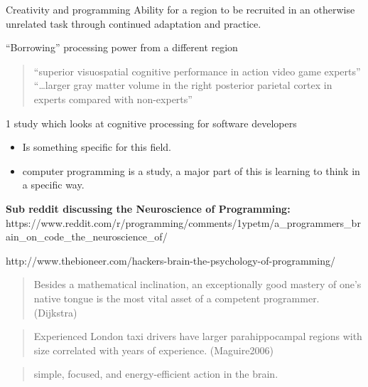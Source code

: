 \begin{frame}{Creativity and programming}
Ability for a region to be recruited in an otherwise unrelated task
through continued adaptation and practice.

``Borrowing'' processing power from a different region

\begin{quote}
``superior visuospatial cognitive performance in action video game
experts'' ``\ldots{}larger gray matter volume in the right posterior
parietal cortex in experts compared with non-experts''
\end{quote}

1 study which looks at cognitive processing for software developers

\begin{itemize}
\tightlist
\item
  Is something specific for this field.
\item
  computer programming is a study, a major part of this is learning to
  think in a specific way.
\end{itemize}

\textbf{Sub reddit discussing the Neuroscience of Programming:}
https://www.reddit.com/r/programming/comments/1ypetm/a\_programmers\_brain\_on\_code\_the\_neuroscience\_of/

http://www.thebioneer.com/hackers-brain-the-psychology-of-programming/

\begin{quote}
Besides a mathematical inclination, an exceptionally good mastery of
one's native tongue is the most vital asset of a competent programmer.
(Dijkstra)
\end{quote}

\begin{quote}
Experienced London taxi drivers have larger parahippocampal regions with
size correlated with years of experience. (Maguire2006)
\end{quote}

\begin{quote}
simple, focused, and energy-efficient action in the brain.
\end{quote}

\end{frame}

